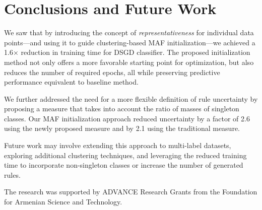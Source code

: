 \documentclass[10pt,a4paper,oneside]{article}
\begin{document}
\section{Conclusions and Future Work}
We saw that by introducing the concept of \textit{representativeness} for individual data points—and using it to guide clustering-based MAF initialization—we achieved a 1.6× reduction in training time for DSGD classifier. The proposed initialization method not only offers a more favorable starting point for optimization{\color{black},} but also reduces the number of required epochs, all while preserving predictive performance equivalent to baseline method.

We further addressed the need for a more flexible definition of rule uncertainty by proposing a measure that takes into account the ratio of masses of singleton classes. Our MAF initialization approach reduced uncertainty by a factor of 2.6 using the newly proposed measure and by 2.1 using the traditional measure.

Future work may involve extending this approach to multi-label datasets, exploring additional clustering techniques, and leveraging the reduced training time to incorporate non-singleton classes or increase the number of generated rules.


\begin{Acknowledgements}
The research was supported by ADVANCE Research Grants from the Foundation for Armenian Science and Technology.
\end{Acknowledgements}
\end{document}
